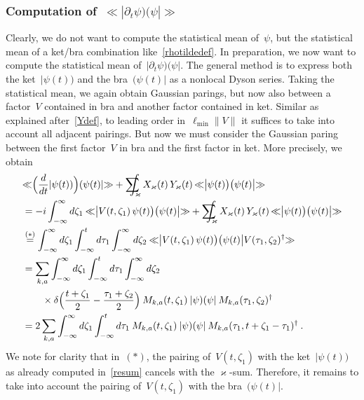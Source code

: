 \documentclass[reqno,11pt]{amsart}
\numberwithin{equation}{section}
\newcommand{\bbra}{\mathopen{\ll}}
\newcommand{\kket}{\mathclose{\gg}}
\newcommand{\1}{\mathds{1}}
\newcommand{\sint}{\sum  \!\!\!\!\!\!\! \int }
\begin{document}
{\subsubsection{Computation of~$\bbra |\partial_t \psi )( \psi| \kket$} \label{sectpsipsi}
Clearly, we do not want to compute the statistical mean of~$\psi$, but the statistical mean of
a ket/bra combination like~\eqref{rhotildedef}. In preparation, we now want to compute
the statistical mean of~$|\partial_t \psi)(\psi|$.
The general method is to express both the ket~$|\psi(t))$ and the bra~$(\psi(t)|$ as a nonlocal Dyson series.
Taking the statistical mean, we again obtain Gaussian parings, but now also between
a factor~$V$ contained in bra and another factor contained in ket.
Similar as explained after~\eqref{Ydef}, to leading order in~$\ell_{\min} \|V\|$ it suffices to take into account 
all adjacent pairings. But now we must consider the Gaussian paring between the first factor~$V$ in bra
and the first factor in ket. More precisely, we obtain
\begin{align}
&\bbra \Big( \frac{d}{dt} |\psi(t)) \Big)  ( \psi(t) | \kket + 
\sint_\varkappa X_\varkappa(t)\, Y_\varkappa(t) \, \bbra \big| \psi(t) \big) \big( \psi(t) \big| \kket \notag \\
&= -i \int_{-\infty}^\infty d\zeta_1 \: \bbra \big| V(t, \zeta_1)\, \psi(t) \big) \big( \psi(t) \big| \kket
+ \sint_\varkappa X_\varkappa(t)\, Y_\varkappa(t) \, \bbra \big| \psi(t) \big) \big( \psi(t) \big| \kket \notag \\
&\overset{(*)}{=} \int_{-\infty}^\infty d\zeta_1 \int_{-\infty}^t d\tau_1 \int_{-\infty}^\infty d\zeta_2\:
\bbra \big| V(t, \zeta_1)\, \psi(t) \big) \big( \psi(t) \big| V(\tau_1, \zeta_2)^\dagger \kket \notag \\
&= \sum_{k,a} \int_{-\infty}^\infty d\zeta_1 \int_{-\infty}^t d\tau_1 \int_{-\infty}^\infty d\zeta_2 \notag \\
&\qquad \times \delta \Big( \frac{t+\zeta_1}{2} - \frac{\tau_1+\zeta_2}{2} \Big)\:
M_{k,a} (t, \zeta_1)\:|\psi)(\psi|\: M_{k,a} (\tau_1, \zeta_2)^\dagger \notag \\
&= 2 \sum_{k,a} \int_{-\infty}^\infty d\zeta_1 \int_{-\infty}^t d\tau_1\:
M_{k,a} (t, \zeta_1)\:|\psi)(\psi|\: M_{k,a} (\tau_1, t+\zeta_1-\tau_1)^\dagger \:. \label{b1}
\end{align}
We note for clarity that in~$(*)$, the pairing of~$V(t, \zeta_1)$ with the ket~$|\psi(t))$
as already computed in~\eqref{resum} cancels with the $\varkappa$-sum.
Therefore, it remains to take into account the pairing of~$V(t, \zeta_1)$ with the bra~$(\psi(t)|$.

}
\end{document}

